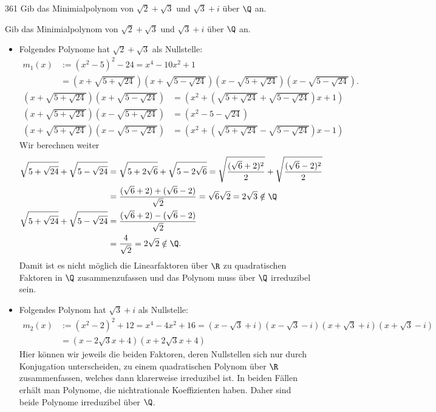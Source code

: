 \begin{algebraUE}{361}
Gib das Minimialpolynom von $\sqrt{2} + \sqrt{3}$ und $\sqrt{3} + i$ über $\Q$ an.
\end{algebraUE}

\begin{solution}
  Gib das Minimialpolynom von $\sqrt{2} + \sqrt{3}$ und $\sqrt{3} + i$ über $\Q$ an.

  \begin{itemize}
  \item Folgendes Polynome hat $\sqrt{2} + \sqrt{3}$ als Nullstelle:
  \begin{align*}
    m_1(x) &:= (x^2 - 5)^2 - 24 = x^4 - 10x^2 + 1 \\
    &= \left(x + \sqrt{5+\sqrt{24}}\right)\left(x + \sqrt{5-\sqrt{24}}\right)
    \left(x - \sqrt{5+\sqrt{24}}\right)\left(x - \sqrt{5-\sqrt{24}}\right).
  \end{align*}
  \begin{align*}
    \left(x + \sqrt{5+\sqrt{24}}\right)\left(x + \sqrt{5-\sqrt{24}}\right) &= \left(x^2 + \left(\sqrt{5+\sqrt{24}} + \sqrt{5-\sqrt{24}}\right)x + 1\right) \\
    \left(x + \sqrt{5+\sqrt{24}}\right)\left(x - \sqrt{5+\sqrt{24}}\right) &= \left(x^2 - 5 - \sqrt{24}\right) \\
    \left(x + \sqrt{5+\sqrt{24}}\right)\left(x - \sqrt{5-\sqrt{24}}\right) &= \left(x^2 + \left(\sqrt{5+\sqrt{24}} - \sqrt{5-\sqrt{24}}\right)x - 1\right)
  \end{align*}
  Wir berechnen weiter
  \begin{align*}
     \sqrt{5+\sqrt{24}} + \sqrt{5-\sqrt{24}} &= \sqrt{5+2\sqrt{6}} + \sqrt{5-2\sqrt{6}}
     = \sqrt{\frac{(\sqrt{6}+2)^2}{2}} + \sqrt{\frac{(\sqrt{6}-2)^2}{2}} \\
     &= \frac{(\sqrt{6}+2) + (\sqrt{6}-2)}{\sqrt{2}} = \sqrt{6}\sqrt{2} = 2\sqrt{3} \notin \Q\\
     \sqrt{5+\sqrt{24}} + \sqrt{5-\sqrt{24}} &= \frac{(\sqrt{6}+2) - (\sqrt{6}-2)}{\sqrt{2}} \\
     &= \frac{4}{\sqrt{2}} = 2\sqrt{2} \notin \Q.
  \end{align*}
  Damit ist es nicht möglich die Linearfaktoren über $\R$ zu quadratischen Faktoren in $\Q$
  zusammenzufassen und das Polynom muss über $\Q$ irreduzibel sein.
  \item Folgendes Polynom hat $\sqrt{3} + i$ als Nullstelle:
  \begin{align*}
    m_2(x) &:= (x^2 -2)^2 + 12 = x^4 - 4x^2 + 16 = (x - \sqrt{3} + i)(x - \sqrt{3} - i)(x + \sqrt{3} + i)(x + \sqrt{3} - i) \\
    &= \left(x - 2\sqrt{3}x + 4\right)\left(x + 2\sqrt{3}x + 4\right)
  \end{align*}
  Hier können wir jeweils die beiden Faktoren, deren Nullstellen sich nur durch Konjugation unterscheiden, zu einem quadratischen Polynom über $\R$ zusammenfassen, welches dann klarerweise irreduzibel ist. In beiden Fällen erhält man Polynome, die nichtrationale Koeffizienten haben. Daher sind beide Polynome irreduzibel über $\Q$.
  \end{itemize}
\end{solution}
